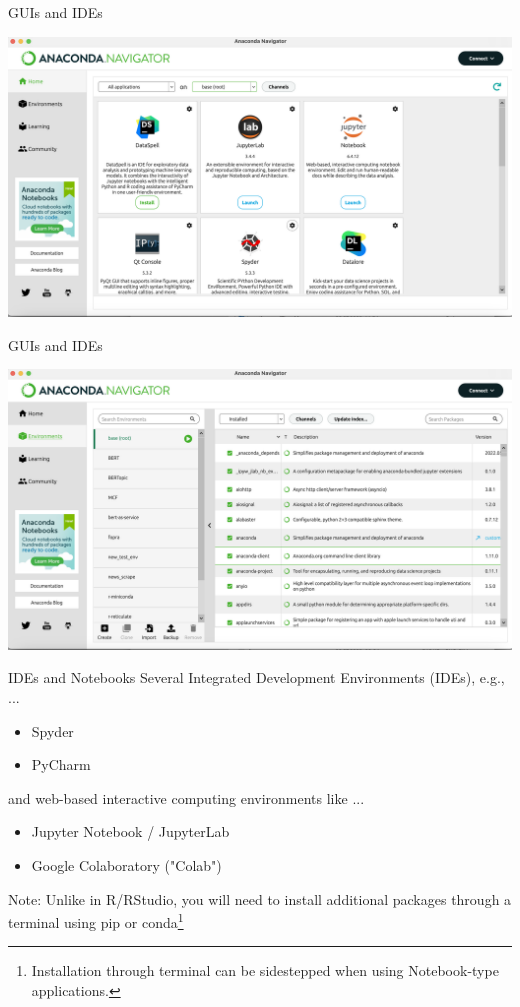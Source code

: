\documentclass[10pt, aspectratio=169]{beamer}
\begin{document}
{ 	\begin{frame}{GUIs and IDEs}
\begin{center}
      \includegraphics[scale=.28]{Day 1/Slides/LaTeX files/Anaconda-navigator.png} \\
     \end{center}
	\end{frame}

  	\begin{frame}{GUIs and IDEs}
\begin{center}
      \includegraphics[scale=.28]{Day 1/Slides/LaTeX files/Anaconda-env.png} \\
     \end{center}
	\end{frame}

  	\begin{frame}{IDEs and Notebooks}
\small
Several Integrated Development Environments (IDEs), e.g., ...
\begin{itemize}
    \item Spyder
    \item PyCharm
\end{itemize}
and web-based interactive computing environments like ...
\begin{itemize}
    \item Jupyter Notebook / JupyterLab
    \item Google Colaboratory ("Colab")
\end{itemize}
Note: Unlike in R/RStudio, you will need to install additional packages through a terminal using pip or conda\footnote{Installation through terminal can be sidestepped when using Notebook-type applications.}
\end{frame}

}
\end{document}
